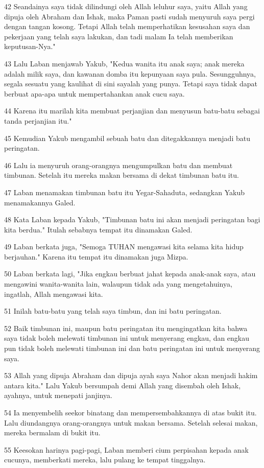 \par 42 Seandainya saya tidak dilindungi oleh Allah leluhur saya, yaitu Allah yang dipuja oleh Abraham dan Ishak, maka Paman pasti sudah menyuruh saya pergi dengan tangan kosong. Tetapi Allah telah memperhatikan kesusahan saya dan pekerjaan yang telah saya lakukan, dan tadi malam Ia telah memberikan keputusan-Nya."
\par 43 Lalu Laban menjawab Yakub, "Kedua wanita itu anak saya; anak mereka adalah milik saya, dan kawanan domba itu kepunyaan saya pula. Sesungguhnya, segala sesuatu yang kaulihat di sini sayalah yang punya. Tetapi saya tidak dapat berbuat apa-apa untuk mempertahankan anak cucu saya.
\par 44 Karena itu marilah kita membuat perjanjian dan menyusun batu-batu sebagai tanda perjanjian itu."
\par 45 Kemudian Yakub mengambil sebuah batu dan ditegakkannya menjadi batu peringatan.
\par 46 Lalu ia menyuruh orang-orangnya mengumpulkan batu dan membuat timbunan. Setelah itu mereka makan bersama di dekat timbunan batu itu.
\par 47 Laban menamakan timbunan batu itu Yegar-Sahaduta, sedangkan Yakub menamakannya Galed.
\par 48 Kata Laban kepada Yakub, "Timbunan batu ini akan menjadi peringatan bagi kita berdua." Itulah sebabnya tempat itu dinamakan Galed.
\par 49 Laban berkata juga, "Semoga TUHAN mengawasi kita selama kita hidup berjauhan." Karena itu tempat itu dinamakan juga Mizpa.
\par 50 Laban berkata lagi, "Jika engkau berbuat jahat kepada anak-anak saya, atau mengawini wanita-wanita lain, walaupun tidak ada yang mengetahuinya, ingatlah, Allah mengawasi kita.
\par 51 Inilah batu-batu yang telah saya timbun, dan ini batu peringatan.
\par 52 Baik timbunan ini, maupun batu peringatan itu mengingatkan kita bahwa saya tidak boleh melewati timbunan ini untuk menyerang engkau, dan engkau pun tidak boleh melewati timbunan ini dan batu peringatan ini untuk menyerang saya.
\par 53 Allah yang dipuja Abraham dan dipuja ayah saya Nahor akan menjadi hakim antara kita." Lalu Yakub bersumpah demi Allah yang disembah oleh Ishak, ayahnya, untuk menepati janjinya.
\par 54 Ia menyembelih seekor binatang dan mempersembahkannya di atas bukit itu. Lalu diundangnya orang-orangnya untuk makan bersama. Setelah selesai makan, mereka bermalam di bukit itu.
\par 55 Keesokan harinya pagi-pagi, Laban memberi cium perpisahan kepada anak cucunya, memberkati mereka, lalu pulang ke tempat tinggalnya.

